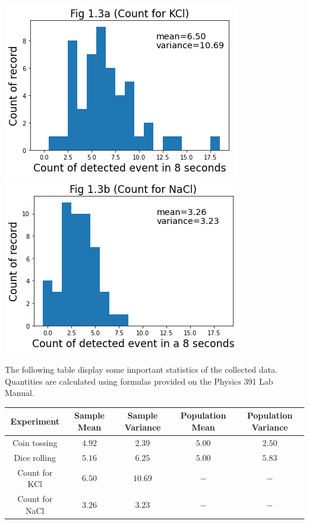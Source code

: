 \documentclass[11pt]{book}
\theoremstyle{break}
\theoremstyle{break}
\begin{document}
\begin{center}
\includegraphics[scale=0.5]{Fig1.3a.png}\qquad
\includegraphics[scale=0.5]{Fig1.3b.png}
\end{center}
\hfill\break

The following table display some important statistics of the collected data. Quantities are calculated using formulas provided on the Physics 391 Lab Manual. 
\begin{center}
\begin{tabular}{|c|c|c|c|c|}
\hline 
Experiment & Sample Mean & Sample Variance & Population Mean & Population Variance \\
\hline
Coin tossing & $4.92$ & $2.39$ & $5.00$ & $2.50$\\
\hline 
Dice rolling & $5.16$ & $6.25$ & $5.00$ & $5.83$\\
\hline
Count for KCl & $6.50$ & $10.69$ & $-$ & $-$\\
\hline
Count for NaCl & $3.26$ & $3.23$ & $-$ & $-$\\
\hline
\end{tabular}
\end{center}
\end{document}
